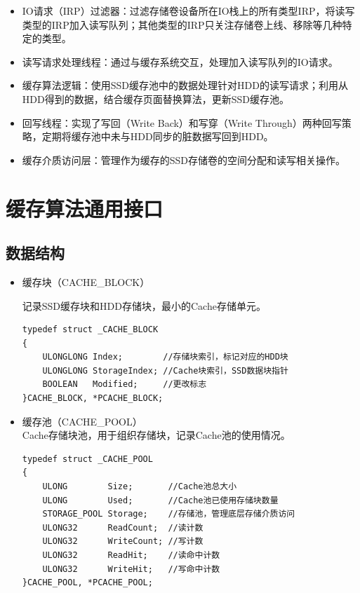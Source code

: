 \begin{itemize}
\item
IO请求（IRP）过滤器：过滤存储卷设备所在IO栈上的所有类型IRP，将读写类型的IRP加入读写队列；其他类型的IRP只关注存储卷上线、移除等几种特定的类型。
\item
读写请求处理线程：通过与缓存系统交互，处理加入读写队列的IO请求。
\item
缓存算法逻辑：使用SSD缓存池中的数据处理针对HDD的读写请求；利用从HDD得到的数据，结合缓存页面替换算法，更新SSD缓存池。
\item
回写线程：实现了写回（Write Back）和写穿（Write Through）两种回写策略，定期将缓存池中未与HDD同步的脏数据写回到HDD。
\item
缓存介质访问层：管理作为缓存的SSD存储卷的空间分配和读写相关操作。
\end{itemize}


\section{缓存算法通用接口}
\label{sec:cache_interface}

\subsection{数据结构}
\begin{itemize}

\item 缓存块（CACHE\_BLOCK）

记录SSD缓存块和HDD存储块，最小的Cache存储单元。
\begin{lstlisting}
typedef struct _CACHE_BLOCK
{
    ULONGLONG Index;        //存储块索引，标记对应的HDD块
    ULONGLONG StorageIndex; //Cache块索引，SSD数据块指针
    BOOLEAN   Modified;     //更改标志
}CACHE_BLOCK, *PCACHE_BLOCK;
\end{lstlisting}

\item 缓存池（CACHE\_POOL）
\\Cache存储块池，用于组织存储块，记录Cache池的使用情况。
\begin{lstlisting}
typedef struct _CACHE_POOL
{
    ULONG        Size;       //Cache池总大小
    ULONG        Used;       //Cache池已使用存储块数量
    STORAGE_POOL Storage;    //存储池，管理底层存储介质访问
    ULONG32      ReadCount;  //读计数
    ULONG32      WriteCount; //写计数
    ULONG32      ReadHit;    //读命中计数
    ULONG32      WriteHit;   //写命中计数
}CACHE_POOL, *PCACHE_POOL;
\end{lstlisting}

\end{itemize}

